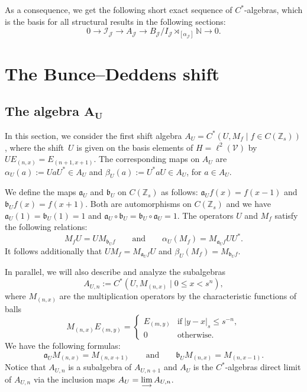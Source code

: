 \documentclass[10pt,a4paper]{amsart}
\newcommand{\N}{{\mathbb N}}
\newcommand{\Z}{{\mathbb Z}}
\newcommand{\fancyJ}{\mathcal{J}}
\numberwithin{equation}{section}
\begin{document}
As a consequence, we get the following short exact sequence of $C^*$-algebras, which is the basis for all structural results in the following sections:
\begin{equation}\label{SESequence}
0\to \mathcal{I}_\mathcal{J}\to A_\mathcal{J}\to B_\fancyJ/I_\fancyJ \rtimes_{[\alpha_\fancyJ]} \N\to 0.
\end{equation}

\section{The Bunce--Deddens shift}
\subsection[The algebra A\_U]{The algebra $\boldsymbol{A_U}$}
In this section, we consider the first shift algebra
$A_U=C^*(U,M_f\mid f\in C(\Z_s))$,
where the shift~$U$ is given on the basis elements of $H=\ell^2(\mathcal{V})$ by $UE_{(n,x)}= E_{(n+1, x+1)}$. The corresponding maps on $A_U$ are
$\alpha_U(a):=U aU^* \in A_U $ and $\beta_U(a):=U^* a U \in A_U$, for $a\in A_U$.

We define the maps $\mathfrak{a}_U$ and $\mathfrak{b}_U$ on $C(\Z_s)$ as follows:
$\mathfrak{a}_Uf(x) = f(x-1)$ and $\mathfrak{b}_Uf(x) = f(x+1) $.
Both are automorphisms on $C(\Z_s)$ and we have
$
\mathfrak{a}_U(1)=\mathfrak{b}_U(1)=1$ and ${\mathfrak{a}_U\circ\mathfrak{b}_U=\mathfrak{b}_U\circ\mathfrak{a}_U=1}$.
The operators $U$ and $M_f$ satisfy the following relations:
\[
M_fU=UM_{\mathfrak{b}_Uf}\qquad \text{and} \qquad \alpha_U(M_f)=\allowbreak M_{\mathfrak{a}_Uf}UU^* .
\]
It follows additionally that
$
UM_f=M_{\mathfrak{a}_Uf}U$ and $ \beta_U(M_f) = M_{\mathfrak{b}_U f}$.

In parallel, we will also describe and analyze the subalgebras
\[
A_{U,n}:=C^*(U,M_{(n,x)}\mid 0\le x < s^n),
\]
where $M_{(n,x)}$ are the multiplication operators by the characteristic functions of balls
\begin{equation*}
M_{(n,x)}E_{(m,y)} =
\begin{cases}
E_{(m,y)} &\textrm{if}\ |y-x|_s \le s^{-n},\\
0 &\textrm{otherwise}.
\end{cases}
\end{equation*}
We have the following formulas:
\begin{equation*}
\mathfrak{a}_UM_{(n,x)} = M_{(n,x+1)}\qquad\text{and}\qquad \mathfrak{b}_UM_{(n,x)} = M_{(n,x-1)} .
\end{equation*}
Notice that $A_{U,n}$ is a subalgebra of $A_{U,n+1}$ and $A_U$ is the $C^*$-algebras direct limit of $A_{U,n}$ via the inclusion maps
$A_U = \smash{\lim\limits_{\longrightarrow} A_{U,n}}$.
\end{document}

